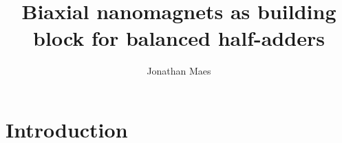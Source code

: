 \documentclass{article}
\title{Biaxial nanomagnets as building block for balanced half-adders}
\author{Jonathan Maes}
\begin{document}
\maketitle

\section{Introduction}
\end{document}
